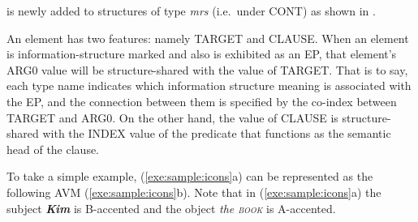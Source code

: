  is newly added to structures of type {\it mrs} (i.e.\ under
CONT) as shown in .  



\noindent An  element has two features: namely TARGET and
CLAUSE. When an element is information-structure
marked and also is exhibited as an EP, that element's ARG0 value will
be structure-shared with the value of TARGET.  That is to say, each
type name indicates which information structure meaning is associated
with the EP, and the connection between them is specified by the
co-index between TARGET and ARG0.  On the other hand, the value of
CLAUSE is structure-shared with the INDEX value of the predicate that
functions as the semantic head of the clause.



To take a simple example, (\ref{exe:sample:icons}a) can be represented
as the following AVM (\ref{exe:sample:icons}b).  Note that in
(\ref{exe:sample:icons}a) the subject \textit{\textbf{Kim}} is
B-accented and the object \textit{the \textsc{book}} is
A-accented.


